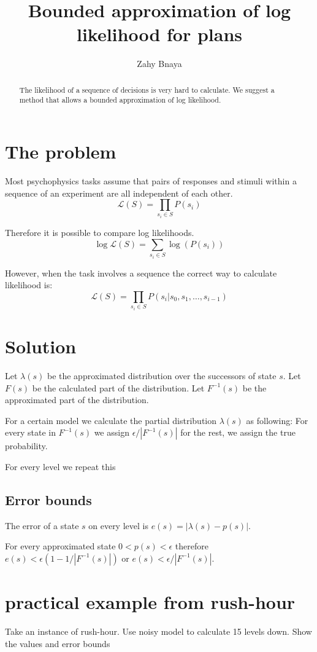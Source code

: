 \documentclass{article}
\begin{document}
\title{Bounded approximation of log likelihood for plans}
\author{Zahy  Bnaya}

\maketitle

\begin{abstract}
 The likelihood of a sequence of decisions is very hard to calculate. 
 We suggest a method that allows a bounded approximation of log likelihood.
\end{abstract}

\section{The problem}

Most psychophysics tasks assume that pairs of responses and stimuli within a sequence of an experiment are all independent of each other. 
\begin{equation}
    \label{Likelihood}
    \mathcal{L}(S) = \prod_{s_i \in S}{P(s_i)} 
\end{equation}

Therefore it is possible to compare log likelihoods. 
$$
   \log{\mathcal{L}(S)} = \sum_{s_i \in S} {\log(P(s_i))}
$$

However, when the task involves a sequence the correct way to calculate likelihood is: 
$$
\mathcal{L}(S) = \prod_{s_i \in S}{P(s_i|s_0,s_1,\ldots,s_{i-1})} 
$$

\section{Solution}
Let $\lambda(s)$ be the approximated distribution over the successors of state $s$. 
Let $F(s)$ be the calculated part of the distribution.
Let $F^{-1}(s)$ be the approximated part of the distribution. 

For a certain model we calculate the partial distribution $\lambda(s)$ as following:
For every state in $F^{-1}(s)$ we assign $\epsilon/|F^{-1}(s)|$ for the rest, we assign the true probability. 

For every level we repeat this


\subsection{Error bounds}

The error of a state $s$ on every level is $e(s)= |\lambda(s)- p(s)|$.

For every approximated state $0 < p(s) < \epsilon$ therefore
$e(s)<\epsilon (1-1/|F^{-1}(s)|)$ or $e(s)<\epsilon/|F^{-1}(s)|$.

\section{practical example from rush-hour}

Take an instance of rush-hour.
Use noisy model to calculate 15 levels down. 
Show the values and error bounds
\end{document}
